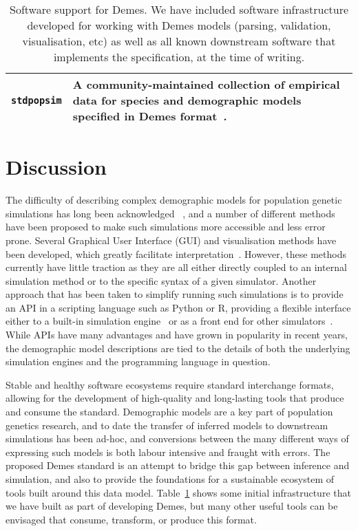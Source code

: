 \documentclass[11pt]{article}
\newcommand{\stdpopsim}[0]{\texttt{stdpopsim}}
\begin{document}
\begin{table}
\begin{center}
\begin{tabular}{lp{12cm}}
\stdpopsim &
    A community-maintained collection of empirical data for species
    and demographic models specified in Demes
    format~\citep{adrion2020community}.\\

\bottomrule
\end{tabular}
\end{center}
\caption{\label{tab-software}
Software support for Demes. We have included software infrastructure developed
for working with Demes models (parsing, validation, visualisation, etc)
as well as all known downstream software that implements the specification,
at the time of writing.}
\end{table}

\section*{Discussion}

The difficulty of describing complex demographic models
for population genetic simulations has long been acknowledged
~\citep[][e.g.]{antao2007modeler4simcoal2}, %
and a number of different methods have been proposed to
make such simulations more accessible and less error prone.
Several Graphical User Interface (GUI) and visualisation
methods have been developed, which greatly facilitate
interpretation~\citep{mailund2005coasim,antao2007modeler4simcoal2,
ewing2010msms,zhou2018popdemog}. However, these methods
currently have little traction as they are all either directly coupled
to an internal simulation method or to the specific syntax
of a given simulator. Another approach that has been taken to
simplify running such simulations is to provide an API in a
scripting language such as Python or R, providing a flexible
interface either to a built-in simulation
engine~\citep{thornton2014cpp,kelleher2016efficient,haller2017flexible}
or as a front end for other simulators~\citep{staab2016coala}.
While APIs have many advantages and have grown in popularity in
recent years, the demographic model descriptions are tied
to the details of both the underlying simulation engines
and the programming language in question.

Stable and healthy software ecosystems require standard interchange
formats, allowing for the development of high-quality and long-lasting
tools that produce and consume the standard.
Demographic models are a key part of population genetics research,
and to date the transfer of inferred models to downstream simulations
has been ad-hoc, and conversions between the many different ways
of expressing such models is both labour intensive and fraught with errors.
The proposed Demes standard is an attempt to bridge this gap
between inference and simulation, and also to provide the foundations
for a sustainable ecosystem of tools built around this data model.
Table~\ref{tab-software} shows some initial infrastructure that we have
built as part of developing Demes, but many other useful tools
can be envisaged that consume, transform, or produce this format.
\end{document}
